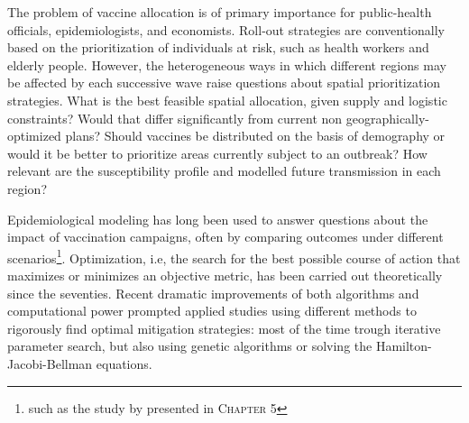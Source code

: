 The problem of vaccine allocation is of primary importance for  public-health officials, epidemiologists, and economists\cite[-7.5\baselineskip]{Emanuel:EthicalFrameworkGlobal:2020, Lipsitch:UnderstandingCOVID19Vaccine:2020}. 
Roll-out strategies are conventionally based on the prioritization of individuals at risk, such as health workers and elderly people\cite[-6.5\baselineskip]{Bubar:ModelinformedCOVID19Vaccine:2021,Fitzpatrick:OptimizingAgespecificVaccination:2021,Baden:EfficacySafetyMRNA1273:2020,Yang:WhoShouldBe:2021}. However, the heterogeneous ways in which different regions may be affected by each successive wave raise questions about spatial prioritization strategies. What is the best feasible spatial allocation, given supply and logistic constraints? Would that differ significantly from current non geographically-optimized plans? Should vaccines be distributed on the basis of demography or would it be better to prioritize areas currently subject to an outbreak? How relevant are the susceptibility profile and modelled future transmission in each region? 

Epidemiological modeling has long been used to answer questions about the impact of vaccination campaigns, often by comparing outcomes under different scenarios\footnote[][-9.3\baselineskip]{such as the study by \textcite{Lee:AchievingCoordinatedNational:2020} presented in \textsc{Chapter 5}}. Optimization, i.e, the search for the best possible course of action that maximizes or minimizes an objective metric, has been carried out theoretically since the seventies. Recent dramatic improvements of both algorithms\cite[-8.5\baselineskip]{Quirynen:MultipleShootingMicrosecond:2015} and computational power prompted applied studies using different methods to rigorously find optimal mitigation strategies: most of the time trough iterative parameter search, but also using genetic algorithms or solving the Hamilton-Jacobi-Bellman equations.

